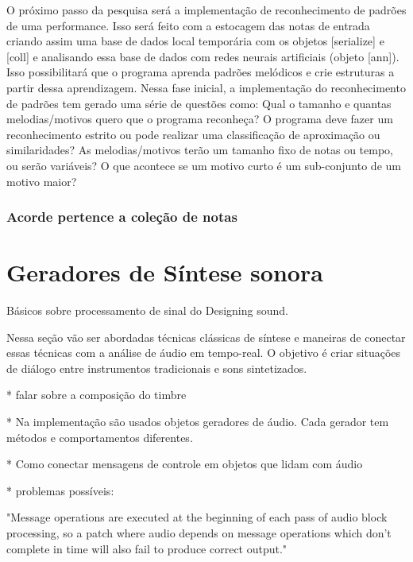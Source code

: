 \documentclass{ppgmus}
\begin{document}
O próximo passo da pesquisa será a implementação de reconhecimento de padrões de uma performance. 
Isso será feito com a estocagem das notas de entrada criando assim uma base de dados local temporária
com os objetos [serialize] e [coll] e analisando essa base de dados com redes neurais artificiais 
(objeto [ann]). Isso possibilitará que o programa aprenda padrões melódicos e crie estruturas a 
partir dessa aprendizagem.
	Nessa fase inicial, a implementação do reconhecimento de padrões tem gerado uma série de 
questões como: Qual o tamanho e quantas melodias/motivos quero que o programa reconheça? O programa 
deve fazer um reconhecimento estrito ou pode realizar uma classificação de aproximação ou 
similaridades? As melodias/motivos terão um tamanho fixo de notas ou tempo, ou serão variáveis? 
O que acontece se um motivo curto é um sub-conjunto de um motivo maior?





\subsubsection{Acorde pertence a coleção de notas}






\pagebreak

\section{Geradores de Síntese sonora}

Básicos sobre processamento de sinal do Designing sound.

Nessa seção vão ser abordadas técnicas clássicas de síntese
e maneiras de conectar essas técnicas com a análise
de áudio em tempo-real. O objetivo é criar situações
de diálogo entre instrumentos tradicionais e sons sintetizados.


* falar sobre a composição do timbre

* Na implementação são usados objetos geradores de áudio.
Cada gerador tem métodos e comportamentos diferentes.

* Como conectar mensagens de controle em objetos que lidam com áudio

* problemas possíveis: 

"Message operations are executed at the beginning of each pass of audio
block processing, so a patch where audio depends on message operations
which don't complete in time will also fail to produce correct output."
\end{document}
